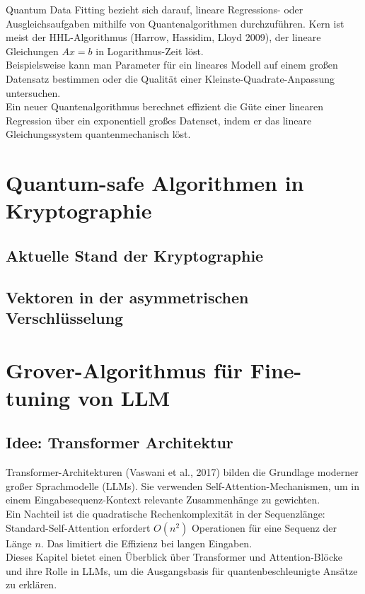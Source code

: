 Quantum Data Fitting bezieht sich darauf, lineare Regressions- oder Ausgleichsaufgaben mithilfe von Quantenalgorithmen durchzuführen. Kern ist meist der HHL-Algorithmus (Harrow, Hassidim, Lloyd 2009), der lineare Gleichungen $Ax=b$ in Logarithmus-Zeit löst.\\
Beispielsweise kann man Parameter für ein lineares Modell auf einem großen Datensatz bestimmen oder die Qualität einer Kleinste-Quadrate-Anpassung untersuchen.\\
Ein neuer Quantenalgorithmus berechnet effizient die Güte einer linearen Regression über ein exponentiell großes Datenset, indem er das lineare Gleichungssystem quantenmechanisch löst.
 

\section{Quantum-safe Algorithmen in Kryptographie}
\subsection{Aktuelle Stand der Kryptographie}
\subsection{Vektoren in der asymmetrischen Verschlüsselung}

\section{Grover-Algorithmus für Fine-tuning von LLM}
\subsection{Idee: Transformer Architektur}
Transformer-Architekturen (Vaswani et al., 2017) bilden die Grundlage moderner großer Sprachmodelle (LLMs). Sie verwenden Self-Attention-Mechanismen, um in einem Eingabesequenz-Kontext relevante Zusammenhänge zu gewichten.\\
Ein Nachteil ist die quadratische Rechenkomplexität in der Sequenzlänge: Standard-Self-Attention erfordert $O(n^2)$ Operationen für eine Sequenz der Länge $n$. Das limitiert die Effizienz bei langen Eingaben.\\
Dieses Kapitel bietet einen Überblick über Transformer und Attention-Blöcke und ihre Rolle in LLMs, um die Ausgangsbasis für quantenbeschleunigte Ansätze zu erklären.

